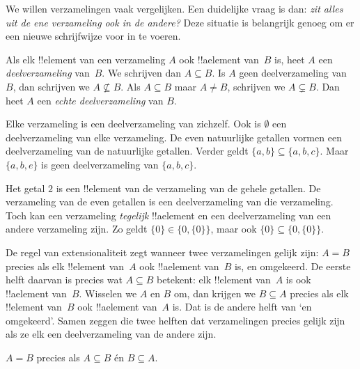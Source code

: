 \documentclass[../../../include/open-logic-section]{subfiles}
\begin{document}

\begin{explain}
We willen verzamelingen vaak vergelijken. Een duidelijke vraag is dan:
\emph{zit alles uit de ene verzameling ook in de andere?} Deze situatie is
belangrijk genoeg om er een nieuwe schrijfwijze voor in te voeren.
\end{explain}

\begin{defn}[Deelverzameling]
Als elk !!{element} van een verzameling $A$ ook !!a{element} van~$B$
is, heet $A$ een \emph{deelverzameling} van~$B$. We schrijven dan
$A \subseteq B$. Is $A$ geen deelverzameling van~$B$, dan schrijven
we $A \not\subseteq B$. Als $A \subseteq B$ maar $A \neq B$, schrijven
we $A \subsetneq B$. Dan heet $A$ een \emph{echte deelverzameling}
van $B$.
\end{defn}

\begin{ex}
Elke verzameling is een deelverzameling van zichzelf. Ook is
$\emptyset$ een deelverzameling van elke verzameling. De even
natuurlijke getallen vormen een deelverzameling van de natuurlijke
getallen. Verder geldt $\{ a, b \} \subseteq \{ a, b, c \}$. Maar
$\{ a, b, e \}$ is geen deelverzameling van $\{ a, b, c \}$.
\end{ex}

\begin{ex}
Het getal $2$ is een !!{element} van de verzameling van de gehele
getallen. De verzameling van de even getallen is een deelverzameling
van die verzameling. Toch kan een verzameling \emph{tegelijk} !!a{element}
en een deelverzameling van een andere verzameling zijn. Zo geldt
$\{0\} \in \{0, \{0\}\}$, maar ook
$\{0\} \subseteq \{0, \{0\}\}$.
\end{ex}

De regel van extensionaliteit zegt wanneer twee verzamelingen gelijk
zijn: $A = B$ precies als elk !!{element} van~$A$ ook !!a{element}
van~$B$ is, en omgekeerd. De eerste helft daarvan is precies wat
$A \subseteq B$ betekent: elk !!{element} van~$A$ is ook
!!a{element} van~$B$. Wisselen we $A$ en $B$ om, dan krijgen we
$B \subseteq A$ precies als elk !!{element} van~$B$ ook !!a{element}
van~$A$ is. Dat is de andere helft van ‘en omgekeerd’. Samen zeggen
die twee helften dat verzamelingen precies gelijk zijn als ze elk een
deelverzameling van de andere zijn.

\begin{prop}
$A = B$ precies als $A \subseteq B$ én $B \subseteq A$.
\end{prop}
\end{document}
